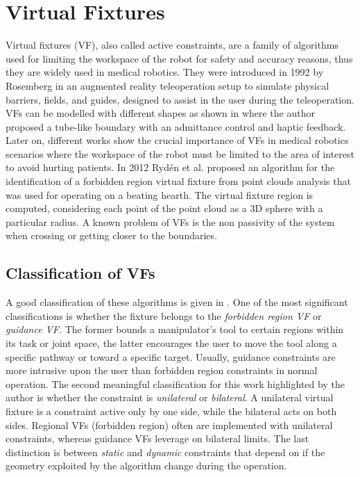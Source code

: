 \newpage
\chapter{Virtual Fixtures}

Virtual fixtures (VF), also called active constraints, are a family of algorithms used for limiting the workspace of the robot for safety and accuracy reasons, thus they are widely used in medical robotics. They were introduced in 1992 \cite{rosemberg1992use} by Rosemberg in an augmented reality teleoperation setup to simulate physical barriers, fields, and guides, designed to assist in the user during the teleoperation. 
VFs can be modelled with different shapes as shown in \cite{bettini_vision-assisted_2004} where the author proposed a tube-like boundary with an admittance control and haptic feedback. Later on, different works show the crucial importance of VFs in medical robotics scenarios where the workspace of the robot must be limited to the area of interest to avoid hurting patients. In 2012 Rydén et al. \cite{ryden_forbidden-region_2012} proposed an algorithm for the identification of a forbidden region virtual fixture from point clouds analysis that was used for operating on a beating hearth. The virtual fixture region is computed, considering each point of the point cloud as a 3D sphere with a particular radius. A known problem of VFs is the non passivity of the system when crossing or getting closer to the boundaries. 

\section{Classification of VFs}

A good classification of these algorithms is given in \cite{bowyer_active_2014}. One of the most significant classifications is whether the fixture belongs to the \textit{forbidden region VF} or \textit{guidance VF}. The former bounds a manipulator’s tool to certain regions within its task or joint space, the latter encourages the user to move the tool along a specific pathway or toward a specific target. Usually, guidance constraints are more intrusive upon the user than forbidden region constraints in normal operation. The second meaningful classification for this work highlighted by the author is whether the constraint is \textit{unilateral} or \textit{bilateral}.
A unilateral virtual fixture is a constraint active only by one side, while the bilateral acts on both sides. 
Regional VFs (forbidden region) often are implemented with unilateral constraints, whereas guidance VFs leverage on bilateral limits.
The last distinction is between \textit{static} and \textit{dynamic} constraints that depend on if the geometry exploited by the algorithm change during the operation.

